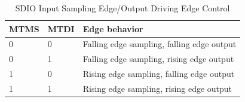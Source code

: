 \documentclass[main\_\_EN.tex]{subfiles}
\begin{document}

\begin{table}[H]
    \centering
    \caption{SDIO Input Sampling Edge/Output Driving Edge Control}
   \label{tab:2.8-sdio-strapping}

    \begin{threeparttable}
    \begin{tabular}{ | p{1.8cm}<{\centering} | p{1.8cm}<{\centering} | p{6.8cm}| }
    \hline
        \rowcolor{lightgray}
        \textbf{MTMS} & \textbf{MTDI} & \textbf{Edge behavior} \\\hline

        0 & 0 & Falling edge sampling, falling edge output \\\hline
        0 & 1 & Falling edge sampling, rising edge output \\\hline
        1 & 0 & Rising edge sampling, falling edge output \\\hline
        1 & 1 & Rising edge sampling, rising edge output \\\hline
        \end{tabular}
     \end{threeparttable}
\end{table}
\end{document}
